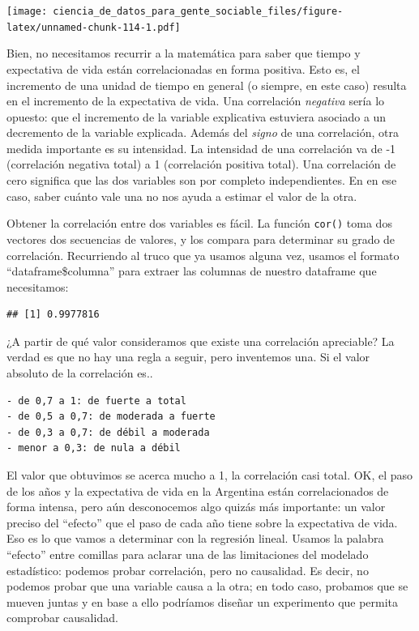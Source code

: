 \documentclass[]{book}
\newenvironment{Shaded}{\begin{snugshade}}{\end{snugshade}}
\newcommand{\KeywordTok}[1]{\textcolor[rgb]{0.13,0.29,0.53}{\textbf{#1}}}
\newcommand{\OperatorTok}[1]{\textcolor[rgb]{0.81,0.36,0.00}{\textbf{#1}}}
\newcommand{\NormalTok}[1]{#1}
\begin{document}
\texttt{[image: ciencia\_de\_datos\_para\_gente\_sociable\_files/figure-latex/unnamed-chunk-114-1.pdf]}

Bien, no necesitamos recurrir a la matemática para saber que tiempo y
expectativa de vida están correlacionadas en forma positiva. Esto es, el
incremento de una unidad de tiempo en general (o siempre, en este caso)
resulta en el incremento de la expectativa de vida. Una correlación
\emph{negativa} sería lo opuesto: que el incremento de la variable
explicativa estuviera asociado a un decremento de la variable explicada.
Además del \emph{signo} de una correlación, otra medida importante es su
intensidad. La intensidad de una correlación va de -1 (correlación
negativa total) a 1 (correlación positiva total). Una correlación de
cero significa que las dos variables son por completo independientes. En
en ese caso, saber cuánto vale una no nos ayuda a estimar el valor de la
otra.

Obtener la correlación entre dos variables es fácil. La función
\texttt{cor()} toma dos vectores dos secuencias de valores, y los
compara para determinar su grado de correlación. Recurriendo al truco
que ya usamos alguna vez, usamos el formato ``dataframe\$columna'' para
extraer las columnas de nuestro dataframe que necesitamos:

\begin{Shaded}
\end{Shaded}

\begin{verbatim}
## [1] 0.9977816
\end{verbatim}

¿A partir de qué valor consideramos que existe una correlación
apreciable? La verdad es que no hay una regla a seguir, pero inventemos
una. Si el valor absoluto de la correlación es..

\begin{verbatim}
- de 0,7 a 1: de fuerte a total
- de 0,5 a 0,7: de moderada a fuerte
- de 0,3 a 0,7: de débil a moderada
- menor a 0,3: de nula a débil
\end{verbatim}

El valor que obtuvimos se acerca mucho a 1, la correlación casi total.
OK, el paso de los años y la expectativa de vida en la Argentina están
correlacionados de forma intensa, pero aún desconocemos algo quizás más
importante: un valor preciso del ``efecto'' que el paso de cada año
tiene sobre la expectativa de vida. Eso es lo que vamos a determinar con
la regresión lineal. Usamos la palabra ``efecto'' entre comillas para
aclarar una de las limitaciones del modelado estadístico: podemos probar
correlación, pero no causalidad. Es decir, no podemos probar que una
variable causa a la otra; en todo caso, probamos que se mueven juntas y
en base a ello podríamos diseñar un experimento que permita comprobar
causalidad.
\end{document}
